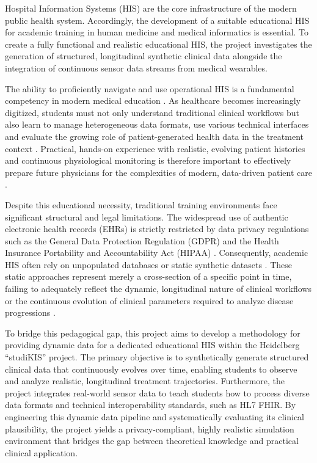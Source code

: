 Hospital Information Systems (HIS) are the core infrastructure of the modern public health system. Accordingly, the development of a suitable educational HIS for academic training in human medicine and medical informatics is essential. To create a fully functional and realistic educational HIS, the project investigates the generation of structured, longitudinal synthetic clinical data alongside the integration of continuous sensor data streams from medical wearables.

The ability to proficiently navigate and use operational HIS is a fundamental competency in modern medical education \citep{BICHELFINDLAY2023104908}. As healthcare becomes increasingly digitized, students must not only understand traditional clinical workflows but also learn to manage heterogeneous data formats, use various technical interfaces and evaluate the growing role of patient-generated health data in the treatment context \citep{healthcare13030329}. Practical, hands-on experience with realistic, evolving patient histories and continuous physiological monitoring is therefore important to effectively prepare future physicians for the complexities of modern, data-driven patient care \citep{Mohan2016-qn}.

Despite this educational necessity, traditional training environments face significant structural and legal limitations. The widespread use of authentic electronic health records (EHRs) is strictly restricted by data privacy regulations such as the General Data Protection Regulation (GDPR) and the Health Insurance Portability and Accountability Act (HIPAA) \citep{Chen2021-ji}. Consequently, academic HIS often rely on unpopulated databases or static synthetic datasets \citep{choi2021}. These static approaches represent merely a cross-section of a specific point in time, failing to adequately reflect the dynamic, longitudinal nature of clinical workflows or the continuous evolution of clinical parameters required to analyze disease progressions \citep{Majumder2017-tg}.

To bridge this pedagogical gap, this project aims to develop a methodology for providing dynamic data for a dedicated educational HIS within the Heidelberg \enquote{studiKIS} project. The primary objective is to synthetically generate structured clinical data that continuously evolves over time, enabling students to observe and analyze realistic, longitudinal treatment trajectories. Furthermore, the project integrates real-world sensor data to teach students how to process diverse data formats and technical interoperability standards, such as HL7 FHIR. By engineering this dynamic data pipeline and systematically evaluating its clinical plausibility, the project yields a privacy-compliant, highly realistic simulation environment that bridges the gap between theoretical knowledge and practical clinical application.